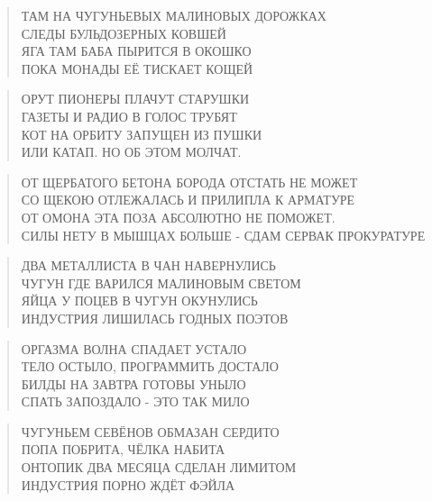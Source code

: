 \poemtitle{***}
\begin{verse}
ТАМ НА ЧУГУНЬЕВЫХ МАЛИНОВЫХ ДОРОЖКАХ\\
СЛЕДЫ БУЛЬДОЗЕРНЫХ КОВШЕЙ\\
ЯГА ТАМ БАБА ПЫРИТСЯ В ОКОШКО\\
ПОКА МОНАДЫ ЕЁ ТИСКАЕТ КОЩЕЙ
\end{verse}

\poemtitle{***}
\begin{verse}
ОРУТ ПИОНЕРЫ ПЛАЧУТ СТАРУШКИ \\
ГАЗЕТЫ И РАДИО В ГОЛОС ТРУБЯТ\\
КОТ НА ОРБИТУ ЗАПУЩЕН ИЗ ПУШКИ\\
ИЛИ КАТАП. НО ОБ ЭТОМ МОЛЧАТ.
\end{verse}

\poemtitle{***}
\begin{verse}
ОТ ЩЕРБАТОГО БЕТОНА БОРОДА ОТСТАТЬ НЕ МОЖЕТ\\
СО ЩЕКОЮ ОТЛЕЖАЛАСЬ И ПРИЛИПЛА К АРМАТУРЕ\\
ОТ ОМОНА ЭТА ПОЗА АБСОЛЮТНО НЕ ПОМОЖЕТ.\\
СИЛЫ НЕТУ В МЫШЦАХ БОЛЬШЕ - СДАМ СЕРВАК ПРОКУРАТУРЕ
\end{verse}

\poemtitle{***}
\begin{verse}
ДВА МЕТАЛЛИСТА В ЧАН НАВЕРНУЛИСЬ\\
ЧУГУН ГДЕ ВАРИЛСЯ МАЛИНОВЫМ СВЕТОМ\\
ЯЙЦА У ПОЦЕВ В ЧУГУН ОКУНУЛИСЬ\\
ИНДУСТРИЯ ЛИШИЛАСЬ ГОДНЫХ ПОЭТОВ
\end{verse}

\poemtitle{***}
\begin{verse}
ОРГАЗМА ВОЛНА СПАДАЕТ УСТАЛО\\
ТЕЛО ОСТЫЛО, ПРОГРАММИТЬ ДОСТАЛО\\
БИЛДЫ НА ЗАВТРА ГОТОВЫ УНЫЛО\\
СПАТЬ ЗАПОЗДАЛО - ЭТО ТАК МИЛО
\end{verse}

\poemtitle{***}
\begin{verse}
ЧУГУНЬЕМ СЕВЁНОВ ОБМАЗАН СЕРДИТО\\
ПОПА ПОБРИТА, ЧЁЛКА НАБИТА\\
ОНТОПИК ДВА МЕСЯЦА СДЕЛАН ЛИМИТОМ\\
ИНДУСТРИЯ ПОРНО ЖДЁТ ФЭЙЛА
\end{verse}

